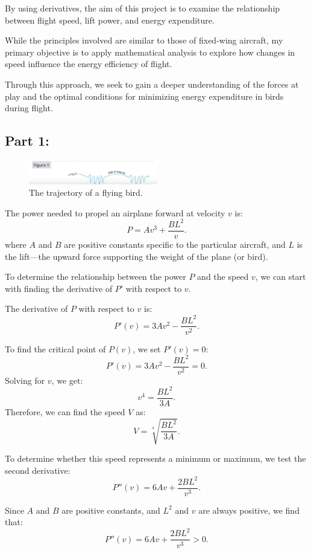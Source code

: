 \documentclass{article}
\begin{document}
By using derivatives, the aim of this project is to examine the relationship between flight speed, lift power, and energy expenditure.

While the principles involved are similar to those of fixed-wing aircraft, my primary objective is to apply mathematical analysis to explore how changes in speed influence the energy efficiency of flight.

Through this approach, we seek to gain a deeper understanding of the forces at play and the optimal conditions for minimizing energy expenditure in birds during flight.


\subsection*{Part 1:}
\begin{figure}[h]
    \centering
    \includegraphics[width=0.5\textwidth]{bird.png}
    \caption{\small The trajectory of a flying bird.}
    \label{fig:bird}
\end{figure}

The power needed to propel an airplane forward at velocity \( v \) is: 
\[
P = Av^3 + \frac{BL^2}{v}.
\]
where \( A \) and \( B \) are positive constants specific to the particular aircraft, and \( L \) is the lift—the upward force supporting the weight of the plane (or bird).
\setlength{\parskip}{2em}

To determine the relationship between the power \(P\) and the speed \(v\), we can start with finding the derivative of \(P'\) with respect to \(v\).

The derivative of \( P \) with respect to \( v \) is:
\[
P'(v) = 3Av^2 - \frac{BL^2}{v^2}.
\]

To find the critical point of \( P(v) \), we set \( P'(v) = 0 \):
\[
P'(v) = 3Av^2 - \frac{BL^2}{v^2} = 0.
\]
Solving for \( v \), we get:
\[
v^4 = \frac{BL^2}{3A}.
\]
Therefore, we can find the speed \( V \) as:
\[
V = \sqrt[4]{\frac{BL^2}{3A}}.
\]

To determine whether this speed represents a minimum or maximum, we test the second derivative:
\[
P''(v) = 6Av + \frac{2BL^2}{v^3}.
\]

Since \( A \) and \( B \) are positive constants, and \( L^2 \) and \( v \) are always positive, we find that:
\[
P''(v) = 6Av + \frac{2BL^2}{v^3} > 0.
\]
\end{document}
